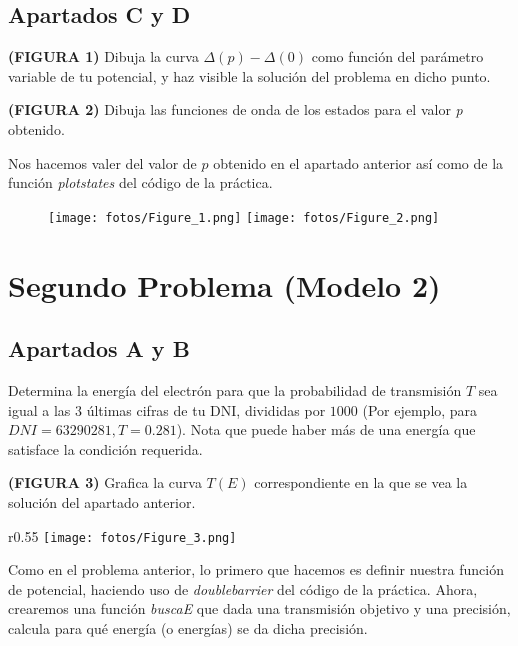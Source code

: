 \documentclass[11pt]{article}
\newcommand{\laputa}[1]{\begin{note}{#1}{}\end{note}}
\begin{document}
    \subsection{Apartados C y D}
    \laputa{\textbf{(FIGURA 1)} Dibuja la curva $\Delta(p) - \Delta(0)$ como función del parámetro variable de tu potencial, y haz visible la solución del problema en dicho punto.}
    \laputa{\textbf{(FIGURA 2)} Dibuja las funciones de onda de los estados para 
    el valor \textit{p} obtenido.}  

        \noindent Nos hacemos valer del valor de $p$ obtenido en el apartado anterior así como de la función \textit{plotstates} del código de la práctica.
        \begin{figure}[ht]
            \centering
            \texttt{[image: fotos/Figure\_1.png]}
            \texttt{[image: fotos/Figure\_2.png]}
        \end{figure} 

\clearpage
\section{Segundo Problema (Modelo 2)}
    \subsection{Apartados A y B}
    \laputa{Determina la energía del electrón para que la probabilidad de transmisión $T$ sea igual a las $3$ últimas cifras de tu DNI, divididas por $1000$ (Por ejemplo, para $DNI = 63290281, T = 0.281$). Nota que puede haber más de una energía que satisface la condición requerida.}
    \laputa{\textbf{(FIGURA 3)} Grafica la curva $T(E)$ correspondiente en la que se vea la solución del apartado anterior.}

    \begin{wrapfigure}[13]{r}{0.55\textwidth}
        \vspace{-0.6cm}
        \centering
        \texttt{[image: fotos/Figure\_3.png]}
    \end{wrapfigure} 

    \noindent Como en el problema anterior, lo primero que hacemos es definir nuestra función de potencial, haciendo uso de \textit{doublebarrier} del código de la práctica. Ahora, crearemos una función \textit{buscaE} que dada una transmisión objetivo y una precisión, calcula para qué energía (o energías) se da dicha precisión.\\
\end{document}
